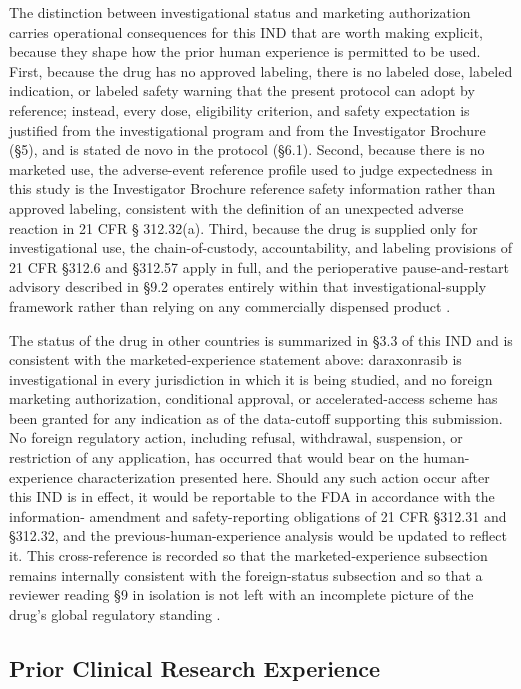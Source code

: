 The distinction between investigational status and marketing authorization carries
operational consequences for this IND that are worth making explicit, because they
shape how the prior human experience is permitted to be used. First, because the
drug has no approved labeling, there is no labeled dose, labeled indication, or
labeled safety warning that the present protocol can adopt by reference; instead,
every dose, eligibility criterion, and safety expectation is justified from the
investigational program and from the Investigator Brochure (\S 5), and is stated
de novo in the protocol (\S 6.1). Second, because there is no marketed use, the
adverse-event reference profile used to judge expectedness in this study is the
Investigator Brochure reference safety information rather than approved labeling,
consistent with the definition of an unexpected adverse reaction in 21 CFR \S
312.32(a). Third, because the drug is supplied only for investigational use, the
chain-of-custody, accountability, and labeling provisions of 21 CFR \S 312.6 and
\S 312.57 apply in full, and the perioperative pause-and-restart advisory described
in \S 9.2 operates entirely within that investigational-supply framework rather
than relying on any commercially dispensed product \cite{cfr312paiuni}.

The status of the drug in other countries is summarized in \S 3.3 of this IND and
is consistent with the marketed-experience statement above: daraxonrasib is
investigational in every jurisdiction in which it is being studied, and no foreign
marketing authorization, conditional approval, or accelerated-access scheme has
been granted for any indication as of the data-cutoff supporting this submission.
No foreign regulatory action, including refusal, withdrawal, suspension, or
restriction of any application, has occurred that would bear on the human-experience
characterization presented here. Should any such action occur after this IND is in
effect, it would be reportable to the FDA in accordance with the information-
amendment and safety-reporting obligations of 21 CFR \S 312.31 and \S 312.32, and
the previous-human-experience analysis would be updated to reflect it. This
cross-reference is recorded so that the marketed-experience subsection remains
internally consistent with the foreign-status subsection and so that a reviewer
reading \S 9 in isolation is not left with an incomplete picture of the drug's
global regulatory standing \cite{cfr312paiuni, daraxwhipple}.

\subsection{Prior Clinical Research Experience}

